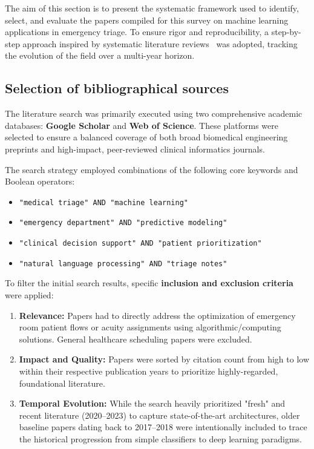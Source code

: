 \documentclass{article}
\begin{document}
The aim of this section is to present the systematic framework used to identify, select, and evaluate the papers compiled for this survey on machine learning applications in emergency triage. To ensure rigor and reproducibility, a step-by-step approach inspired by systematic literature reviews~\cite{Rivera2022} was adopted, tracking the evolution of the field over a multi-year horizon.

\subsection{Selection of bibliographical sources}

The literature search was primarily executed using two comprehensive academic databases: \textbf{Google Scholar} and \textbf{Web of Science}. These platforms were selected to ensure a balanced coverage of both broad biomedical engineering preprints and high-impact, peer-reviewed clinical informatics journals.

The search strategy employed combinations of the following core keywords and Boolean operators:
\begin{itemize}
    \item \texttt{"medical triage" AND "machine learning"}
    \item \texttt{"emergency department" AND "predictive modeling"}
    \item \texttt{"clinical decision support" AND "patient prioritization"}
    \item \texttt{"natural language processing" AND "triage notes"}
\end{itemize}

To filter the initial search results, specific \textbf{inclusion and exclusion criteria} were applied:
\begin{enumerate}
    \item \textbf{Relevance:} Papers had to directly address the optimization of emergency room patient flows or acuity assignments using algorithmic/computing solutions. General healthcare scheduling papers were excluded.
    \item \textbf{Impact and Quality:} Papers were sorted by citation count from high to low within their respective publication years to prioritize highly-regarded, foundational literature.
    \item \textbf{Temporal Evolution:} While the search heavily prioritized "fresh" and recent literature (2020--2023) to capture state-of-the-art architectures, older baseline papers dating back to 2017--2018 were intentionally included to trace the historical progression from simple classifiers to deep learning paradigms.
\end{enumerate}
\end{document}
